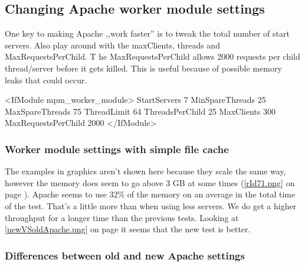 \subsection{Changing Apache worker module settings}\label{subsec:changingApacheSettings}
One key to making Apache ,,work faster'' is to tweak the total number of start servers. Also play around with the maxClients, threads and MaxRequestsPerChild.
T
he MaxRequestsPerChild allows 2000 requests per child thread/server before it gets killed. This is useful because of possible memory leaks that could occur. 
\begin{codelisting}
<IfModule mpm_worker_module>
    StartServers          7
    MinSpareThreads      25
    MaxSpareThreads      75 
    ThreadLimit          64
    ThreadsPerChild      25
    MaxClients          300
    MaxRequestsPerChild   2000
</IfModule>
\end{codelisting}
\subsubsection{Worker module settings with simple file cache}
The examples in graphics aren't shown here because they scale the same way, however the memory does seem to go above 3 GB at some times (\autoref{rId71.png} on page \pageref{rId71.png}). Apache seems to use 32\% of the memory on an average in the total time of the test. That's a little more than when using less servers. 
We do get a higher throughput for a longer time than the previous tests. Looking at \autoref{newVSoldApache.png} on page \pageref{newVSoldApache.png} it seems that the new test is better.

\subsubsection{Differences between old and new Apache settings}

